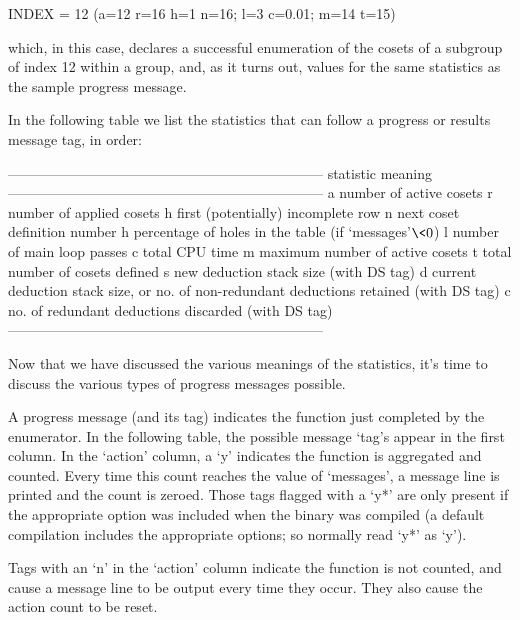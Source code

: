 \begintt
INDEX = 12 (a=12 r=16 h=1 n=16; l=3 c=0.01; m=14 t=15)
\endtt

which, in this case, declares a successful enumeration of  the  cosets
of a subgroup of index 12 within a group, and, as it turns out, values
for the same statistics as the sample progress message.

In the following table we  list  the  statistics  that  can  follow  a
progress or results message tag, in order:

\begintt
--------------------------------------------------------------------
statistic   meaning
--------------------------------------------------------------------
a           number of active cosets
r           number of applied cosets
h           first (potentially) incomplete row
n           next coset definition number
h           percentage of holes in the table (if `messages'$ \< 0$) 
l           number of main loop passes
c           total CPU time
m           maximum number of active cosets
t           total number of cosets defined
s           new deduction stack size (with DS tag)
d           current deduction stack size, or
              no. of non-redundant deductions retained (with DS tag)
c           no. of redundant deductions discarded (with DS tag)
--------------------------------------------------------------------
\endtt

Now that we have discussed the various  meanings  of  the  statistics,
it's time to discuss the various types of progress messages possible.


A progress message (and its tag) indicates the function just completed
by the enumerator. In the following table, the possible message `tag's
appear in the first column. In the `action' column,  a  `y'  indicates
the function is aggregated and counted. Every time this count  reaches
the value of `messages', a message line is printed and  the  count  is
zeroed. Those tags flagged  with  a  `y*'  are  only  present  if  the
appropriate option was included when the {\ACE} binary was compiled (a
default compilation includes the appropriate options; so normally read
`y*' as `y').

Tags with an `n' in the `action' column indicate the function  is  not
counted, and cause a message line to be output every time they  occur.
They also cause the action count to be reset.

